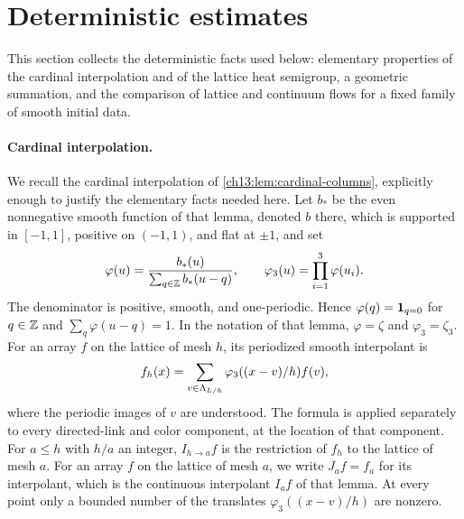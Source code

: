 \section{Deterministic estimates}\label{ch25:sec:deterministic}

This section collects the deterministic facts used below: elementary properties of the cardinal interpolation and of the lattice heat semigroup, a geometric summation, and the comparison of lattice and continuum flows for a fixed family of smooth initial data.

\paragraph{Cardinal interpolation.}
We recall the cardinal interpolation of \cref{ch13:lem:cardinal-columns}, explicitly enough to justify the elementary facts needed here. Let $b_*$ be the even nonnegative smooth function of that lemma, denoted $b$ there, which is supported in $[-1,1]$, positive on $(-1,1)$, and flat at $\pm1$, and set
\[
 \varphi(u)=\frac{b_*(u)}{\sum_{q\in\mathbb Z}b_*(u-q)},\qquad
 \varphi_3(u)=\prod_{i=1}^3\varphi(u_i).
\]
The denominator is positive, smooth, and one-periodic. Hence $\varphi(q)=\mathbf 1_{q=0}$ for $q\in\mathbb Z$ and $\sum_q\varphi(u-q)=1$. In the notation of that lemma, $\varphi=\zeta$ and $\varphi_3=\zeta_3$. For an array $f$ on the lattice of mesh $h$, its periodized smooth interpolant is
\[
 f_h(x)=\sum_{v\in\Lambda_{L/h}}\varphi_3((x-v)/h)f(v),
\]
where the periodic images of $v$ are understood. The formula is applied separately to every directed-link and color component, at the location of that component. For $a\le h$ with $h/a$ an integer, $I_{h\to a}f$ is the restriction of $f_h$ to the lattice of mesh $a$. For an array $f$ on the lattice of mesh $a$, we write $J_af=f_a$ for its interpolant, which is the continuous interpolant $I_af$ of that lemma. At every point only a bounded number of the translates $\varphi_3((x-v)/h)$ are nonzero.

